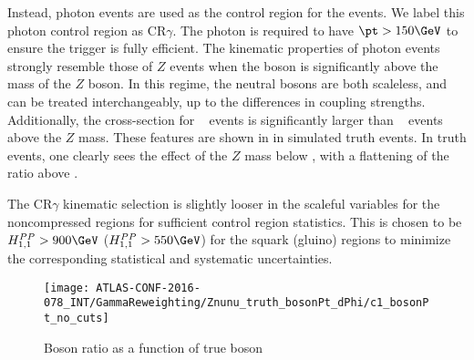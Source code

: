 Instead, photon events are used as the control region for the \Zvv events.
We label this photon control region as CR$\gamma$.
The photon is required to have $\pt > 150 \GeV$ to ensure the trigger is fully efficient.
The kinematic properties of photon events strongly resemble those of $Z$ events when the boson \pt is significantly above the mass of the $Z$ boson.
In this regime, the neutral bosons are both scaleless, and can be treated interchangeably, up to the differences in coupling strengths.
Additionally, the cross-section for \gammajets~ events is significantly larger than \zjets~ events above the $Z$ mass.
These features are shown in  in simulated \Zvv truth events.
In truth events, one clearly sees the effect of the $Z$ mass below  \GeV, with a flattening of the ratio above  \GeV.

The CR$\gamma$ kinematic selection is slightly looser in the scaleful variables for the noncompressed regions for sufficient control region statistics.
This is chosen to be $\HFnm{PP}{1}{1} > 900 \GeV$ ($\HFnm{PP}{1}{1} > 550 \GeV$) for the squark (gluino) regions to minimize the corresponding statistical and systematic uncertainties.
\begin{figure}[tbp]
\caption{Boson \pt ratio as a function of true boson \pt} \label{fig:boson_pt_ratio}
\texttt{[image: ATLAS-CONF-2016-078\_INT/GammaReweighting/Znunu\_truth\_bosonPt\_dPhi/c1\_bosonPt\_no\_cuts]}
\end{figure}

